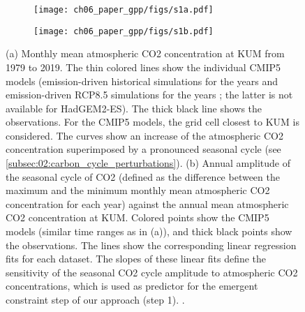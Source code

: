 \begin{figure}[p]
  \centering
  \begin{subfigure}[b]{0.39\columnwidth}
    \texttt{[image: ch06\_paper\_gpp/figs/s1a.pdf]}
    \caption{}
    \label{fig:app:b:co2:a}
  \end{subfigure}
  \begin{subfigure}[b]{0.39\columnwidth}
    \texttt{[image: ch06\_paper\_gpp/figs/s1b.pdf]}
    \caption{}
    \label{fig:app:b:co2:b}
  \end{subfigure}
  \begin{subfigure}[b]{0.2\columnwidth}
  \end{subfigure}
  \caption[
    Monthly mean atmospheric \acs{CO2} concentration at \acl{KUM} from 1979 to
    2019 and the corresponding annual amplitudes of the seasonal cycle of
    \acs{CO2}.
  ]{
    (a) Monthly mean atmospheric \acs{CO2} concentration at \acf{KUM} from 1979
    to 2019. The thin colored lines show the individual \acs{CMIP}5 models
    (emission-driven historical simulations for the years 
    and emission-driven \acs{RCP}8.5 simulations for the years
    ; the latter is not available for \acs{HadGEM}2-ES). The
    thick black line shows the observations. For the \acs{CMIP}5 models, the
    grid cell closest to \acs{KUM} is considered. The curves show an increase
    of the atmospheric \acs{CO2} concentration superimposed by a pronounced
    seasonal cycle (see \cref{subsec:02:carbon_cycle_perturbations}). (b)
    Annual amplitude of the seasonal cycle of \acs{CO2} (defined as the
    difference between the maximum and the minimum monthly mean atmospheric
    \acs{CO2} concentration for each year) against the annual mean atmospheric
    \acs{CO2} concentration at \acs{KUM}. Colored points show the \acs{CMIP}5
    models (similar time ranges as in (a)), and thick black points show the
    observations. The lines show the corresponding linear regression fits for
    each dataset. The slopes of these linear fits define the sensitivity of the
    seasonal \acs{CO2} cycle amplitude to atmospheric \acs{CO2} concentrations,
    which is used as predictor for the emergent constraint step of our approach
    (step 1). .
  }
  \label{fig:app:b:co2}
\end{figure}

